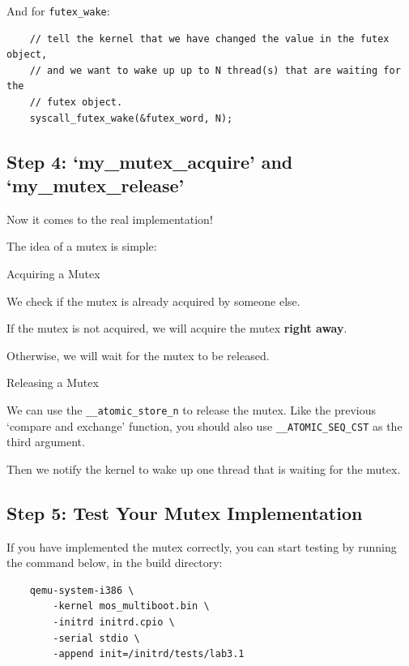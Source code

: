And for \texttt{futex\_wake}:

\begin{verbatim}
    // tell the kernel that we have changed the value in the futex object,
    // and we want to wake up up to N thread(s) that are waiting for the
    // futex object.
    syscall_futex_wake(&futex_word, N);
\end{verbatim}

\subsection{Step 4: `my\_mutex\_acquire' and `my\_mutex\_release'}

Now it comes to the real implementation!

The idea of a mutex is simple:

\begin{tip*}{Acquiring a Mutex}
    \item We check if the mutex is already acquired by someone else.
    \item If the mutex is not acquired, we will acquire the mutex \textbf{right away}.
    \item Otherwise, we will wait for the mutex to be released.
\end{tip*}

\begin{tip*}{Releasing a Mutex}
    \item We can use the \texttt{\_\_atomic\_store\_n} to release the mutex.
    Like the previous `compare and exchange' function, you should also use
    \texttt{\_\_ATOMIC\_SEQ\_CST} as the third argument.
    \item Then we notify the kernel to wake up one thread that is waiting for the mutex.
\end{tip*}

\subsection{Step 5: Test Your Mutex Implementation}

If you have implemented the mutex correctly, you can start testing by running the command
below, in the build directory:

\begin{verbatim}
    qemu-system-i386 \
        -kernel mos_multiboot.bin \
        -initrd initrd.cpio \
        -serial stdio \
        -append init=/initrd/tests/lab3.1
\end{verbatim}

